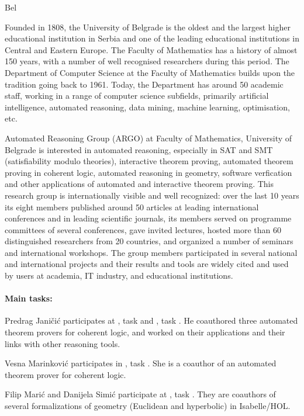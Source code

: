 \begin{sitedescription}{Bel}

  
  Founded in 1808, the University of Belgrade is the oldest and the
  largest higher educational institution in Serbia and one of the
  leading educational institutions in Central and Eastern Europe. The
  Faculty of Mathematics has a history of almost 150 years, with a
  number of well recognised researchers during this period. The
  Department of Computer Science at the Faculty of Mathematics builds
  upon the tradition going back to 1961. Today, the Department has
  around 50 academic staff, working in a range of computer science
  subfields, primarily artificial intelligence, automated reasoning,
  data mining, machine learning, optimisation, etc.

  Automated Reasoning Group (ARGO) at
  Faculty of Mathematics, University of Belgrade is interested in
  automated reasoning, especially in SAT and SMT (satisfiability
  modulo theories), interactive theorem proving, automated theorem
  proving in coherent logic, automated reasoning in geometry, software
  verfication and other applications of automated and interactive
  theorem proving. This research group is internationally visible and
  well recognized: over the last 10 years its eight members published
  around 50 articles at leading international conferences and in
  leading scientific journals, its members served on programme
  committees of several conferences, gave invited lectures, hosted
  more than 60 distinguished researchers from 20 countries, and
  organized a number of seminars and international workshops. The
  group members participated in several national and international
  projects and their results and tools are widely cited and used by
  users at academia, IT industry, and educational institutions.

  \paragraph*{Main tasks:}

  \begin{compactitem}
  \item Predrag Janičić participates at , task
     and 
    , task . 
    He coauthored three automated theorem provers for coherent 
    logic, and worked on their applications and their links 
    with other reasoning tools.
  \item Vesna Marinković participates in , task
    . She is a coauthor of an automated
    theorem prover for coherent logic.
  \item Filip Marić and Danijela Simić participate at
    , task
    . They are coauthors of
    several formalizations of geometry (Euclidean and hyperbolic) in
    Isabelle/HOL.
  \end{compactitem}
  

\end{sitedescription}
